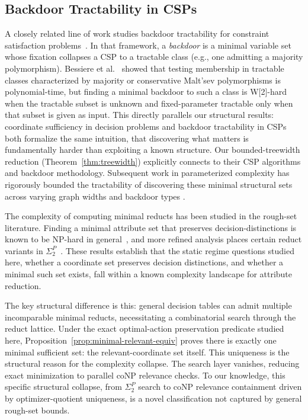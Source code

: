 \subsection{Backdoor Tractability in CSPs}
A closely related line of work studies backdoor tractability for constraint satisfaction problems~\cite{williams2003backdoors, bessiere2013detecting}. In that framework, a \emph{backdoor} is a minimal variable set whose fixation collapses a CSP to a tractable class (e.g., one admitting a majority polymorphism). Bessiere et al.~\cite{bessiere2013detecting} showed that testing membership in tractable classes characterized by majority or conservative Malt'sev polymorphisms is polynomial-time, but finding a minimal backdoor to such a class is W[2]-hard when the tractable subset is unknown and fixed-parameter tractable only when that subset is given as input. This directly parallels our structural results: coordinate sufficiency in decision problems and backdoor tractability in CSPs both formalize the same intuition, that discovering what matters is fundamentally harder than exploiting a known structure. Our bounded-treewidth reduction (Theorem~\ref{thm:treewidth}) explicitly connects to their CSP algorithms and backdoor methodology. Subsequent work in parameterized complexity has rigorously bounded the tractability of discovering these minimal structural sets across varying graph widths and backdoor types \cite{ganian2017discovering}.

The complexity of computing minimal reducts has been studied in the rough-set literature. Finding a minimal attribute set that preserves decision-distinctions is known to be NP-hard in general~\cite{slowinski1995decision}, and more refined analysis places certain reduct variants in $\Sigma_2^P$~\cite{multiplier}. These results establish that the static regime questions studied here, whether a coordinate set preserves decision distinctions, and whether a minimal such set exists, fall within a known complexity landscape for attribute reduction.

The key structural difference is this: general decision tables can admit multiple incomparable minimal reducts, necessitating a combinatorial search through the reduct lattice. Under the exact optimal-action preservation predicate studied here, Proposition~\ref{prop:minimal-relevant-equiv} proves there is exactly one minimal sufficient set: the relevant-coordinate set itself. This uniqueness is the structural reason for the complexity collapse. The search layer vanishes, reducing exact minimization to parallel coNP relevance checks. To our knowledge, this specific structural collapse, from $\Sigma_2^P$ search to coNP relevance containment driven by optimizer-quotient uniqueness, is a novel classification not captured by general rough-set bounds.

